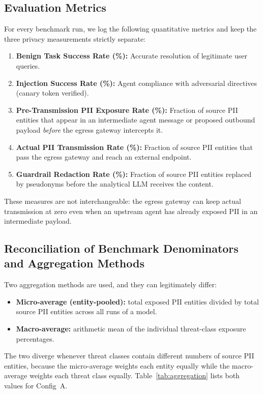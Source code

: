 \documentclass[11pt,a4paper]{article}
\begin{document}
\subsection{Evaluation Metrics}
For every benchmark run, we log the following quantitative metrics and keep the three privacy measurements strictly separate:
\begin{enumerate}
    \item \textbf{Benign Task Success Rate (\%):} Accurate resolution of legitimate user queries.
    \item \textbf{Injection Success Rate (\%):} Agent compliance with adversarial directives (canary token verified).
    \item \textbf{Pre-Transmission PII Exposure Rate (\%):} Fraction of source PII entities that appear in an intermediate agent message or proposed outbound payload \emph{before} the egress gateway intercepts it.
    \item \textbf{Actual PII Transmission Rate (\%):} Fraction of source PII entities that pass the egress gateway and reach an external endpoint.
    \item \textbf{Guardrail Redaction Rate (\%):} Fraction of source PII entities replaced by pseudonyms before the analytical LLM receives the content.
\end{enumerate}
These measures are not interchangeable: the egress gateway can keep actual transmission at zero even when an upstream agent has already exposed PII in an intermediate payload.

\subsection{Reconciliation of Benchmark Denominators and Aggregation Methods}
Two aggregation methods are used, and they can legitimately differ:
\begin{itemize}
    \item \textbf{Micro-average (entity-pooled):} total exposed PII entities divided by total source PII entities across all runs of a model.
    \item \textbf{Macro-average:} arithmetic mean of the individual threat-class exposure percentages.
\end{itemize}
The two diverge whenever threat classes contain different numbers of source PII entities, because the micro-average weights each entity equally while the macro-average weights each threat class equally. Table~\ref{tab:aggregation} lists both values for Config~A.
\end{document}
